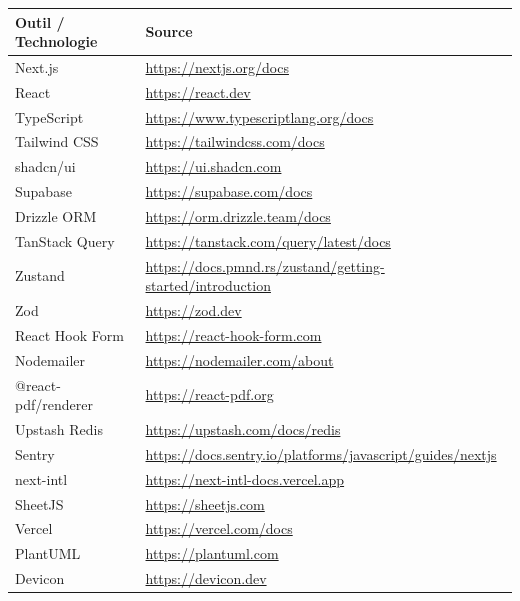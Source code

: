 \documentclass[12pt, a4paper]{report}
\begin{document}
\begin{center}
\begin{tabularx}{\textwidth}{|l|>{\raggedright\arraybackslash}X|}
  \hline
  \rowcolor{accentbg}
  \textbf{Outil / Technologie} & \textbf{Source} \\
  \hline
  Next.js           & \url{https://nextjs.org/docs} \\
  \hline
  React             & \url{https://react.dev} \\
  \hline
  TypeScript        & \url{https://www.typescriptlang.org/docs} \\
  \hline
  Tailwind CSS      & \url{https://tailwindcss.com/docs} \\
  \hline
  shadcn/ui         & \url{https://ui.shadcn.com} \\
  \hline
  Supabase          & \url{https://supabase.com/docs} \\
  \hline
  Drizzle ORM       & \url{https://orm.drizzle.team/docs} \\
  \hline
  TanStack Query    & \url{https://tanstack.com/query/latest/docs} \\
  \hline
  Zustand           & \url{https://docs.pmnd.rs/zustand/getting-started/introduction} \\
  \hline
  Zod               & \url{https://zod.dev} \\
  \hline
  React Hook Form   & \url{https://react-hook-form.com} \\
  \hline
  Nodemailer        & \url{https://nodemailer.com/about} \\
  \hline
  @react-pdf/renderer & \url{https://react-pdf.org} \\
  \hline
  Upstash Redis     & \url{https://upstash.com/docs/redis} \\
  \hline
  Sentry            & \url{https://docs.sentry.io/platforms/javascript/guides/nextjs} \\
  \hline
  next-intl         & \url{https://next-intl-docs.vercel.app} \\
  \hline
  SheetJS           & \url{https://sheetjs.com} \\
  \hline
  Vercel            & \url{https://vercel.com/docs} \\
  \hline
  PlantUML          & \url{https://plantuml.com} \\
  \hline
  Devicon           & \url{https://devicon.dev} \\
  \hline
\end{tabularx}
\end{center}

\end{document}
